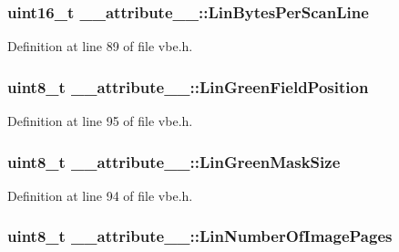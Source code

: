 \subsubsection[{Lin\+Bytes\+Per\+Scan\+Line}]{\setlength{\rightskip}{0pt plus 5cm}uint16\+\_\+t \+\_\+\+\_\+attribute\+\_\+\+\_\+\+::\+Lin\+Bytes\+Per\+Scan\+Line}\label{struct____attribute_____af7036270c257deabc1ebd111faf3e3a5}


Definition at line 89 of file vbe.\+h.

\hypertarget{struct____attribute_____a5571b1959950d520f2b45bb5549994e3}{}
\subsubsection[{Lin\+Green\+Field\+Position}]{\setlength{\rightskip}{0pt plus 5cm}uint8\+\_\+t \+\_\+\+\_\+attribute\+\_\+\+\_\+\+::\+Lin\+Green\+Field\+Position}\label{struct____attribute_____a5571b1959950d520f2b45bb5549994e3}


Definition at line 95 of file vbe.\+h.

\hypertarget{struct____attribute_____a5768a84391f8a26d8a9bfd6a22d5e49d}{}
\subsubsection[{Lin\+Green\+Mask\+Size}]{\setlength{\rightskip}{0pt plus 5cm}uint8\+\_\+t \+\_\+\+\_\+attribute\+\_\+\+\_\+\+::\+Lin\+Green\+Mask\+Size}\label{struct____attribute_____a5768a84391f8a26d8a9bfd6a22d5e49d}


Definition at line 94 of file vbe.\+h.

\hypertarget{struct____attribute_____af9ba0d9902f5336bd9d044a9dee2ba42}{}
\subsubsection[{Lin\+Number\+Of\+Image\+Pages}]{\setlength{\rightskip}{0pt plus 5cm}uint8\+\_\+t \+\_\+\+\_\+attribute\+\_\+\+\_\+\+::\+Lin\+Number\+Of\+Image\+Pages}\label{struct____attribute_____af9ba0d9902f5336bd9d044a9dee2ba42}


